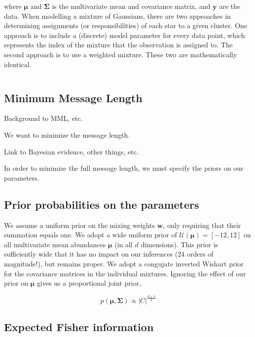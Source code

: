\documentclass{aastex61}
\begin{document}
\noindent{}where $\bm{\mu}$ and $\bm{\Sigma}$ is the multivariate mean and 
covariance matrix, and $\bm{y}$ are the data.  When modelling a mixture of
Gaussians, there are two approaches in determining assignments (or
responsibilities) of each star to a given cluster. One approach is to include
a (discrete) model parameter for every data point, which represents the index
of the mixture that the observation is assigned to. The second approach is to 
use a weighted mixture. These two are mathematically identical.


\begin{equation}
\end{equation}


\subsection{Minimum Message Length}
\label{sec:mml}

Background to MML, etc.

We want to minimize the message length.

Link to Bayesian evidence, other things, etc.

In order to minimize the full message length, we must specify the priors on
our parameters.


\subsection{Prior probabilities on the parameters}


We assume a uniform prior on the mixing weights $\bm{w}$, only requiring that
their summation equals one. We adopt a wide uniform prior of $\mathcal{U}(\bm{\mu}) = [-12, 12]$ on all
multivariate mean abundances $\bm{\mu}$ (in all $d$ dimensions). This prior
is sufficiently wide that it has no impact on our inferences (24 orders of
magnitude!), but remains proper. We adopt a congujate inverted Wishart prior 
for the covariance matrices in the individual mixtures. Ignoring the effect of 
our prior on $\bm{\mu}$ gives us a proportional joint prior,

\begin{equation}
    p(\bm{\mu},\bm{\Sigma}) \propto |C|^{\frac{d + 1}{2}} 
\end{equation}


\subsection{Expected Fisher information}
\end{document}
